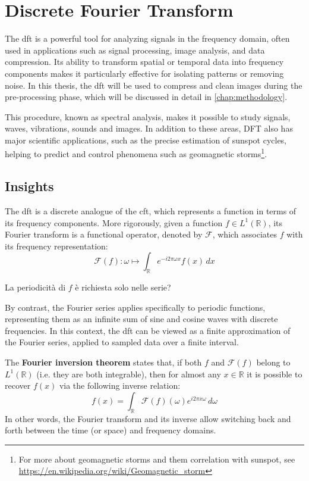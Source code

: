 \section{Discrete Fourier Transform}
\begin{modified}
The \gls{dft} is a powerful tool for analyzing signals in the frequency domain, often used in applications such as signal processing, image analysis, and data compression. Its ability to transform spatial or temporal data into frequency components makes it particularly effective for isolating patterns or removing noise. In this thesis, the \gls{dft} will be used to compress and clean images during the pre-processing phase, which will be discussed in detail in \cref{chap:methodology}.
\end{modified}

\noindent This procedure, known as spectral analysis, makes it possible to study signals, waves, vibrations, sounds and images. In addition to these areas, DFT also has major scientific applications, such as the precise estimation of sunspot cycles, helping to predict and control phenomena such as geomagnetic storms\footnote{For more about geomagnetic storms and them correlation with sunspot, see \url{https://en.wikipedia.org/wiki/Geomagnetic_storm}}.

\subsection{Insights}
\begin{modified}
	The \gls{dft} is a discrete analogue of the \gls{cft}, which represents a function in terms of its frequency components. More rigorously, given a function $f\in L^1(\mathbb{R})$, its Fourier transform is a functional operator, denoted by $\mathcal{F}$, which associates $f$ with its frequency representation:
	\[
		\mathcal{F}(f): \omega \mapsto \int_{\mathbb{R}} e^{-i2\pi \omega x}f(x)\,dx
	\]
	\begin{note}
		La periodicità di $f$ è richiesta solo nelle serie?
	\end{note}

	\noindent By contrast, the Fourier series applies specifically to periodic functions, representing them as an infinite sum of sine and cosine waves with discrete frequencies. In this context, the \gls{dft} can be viewed as a finite approximation of the Fourier series, applied to sampled data over a finite interval.
\end{modified}

\noindent The \textbf{Fourier inversion theorem} states that, if both $f$ and $\mathcal{F}(f)$ belong to $L^1(\mathbb{R})$ (i.e. they are both integrable), then for almost any $x\in\mathbb{R}$ it is possible to recover $f(x)$ via the following inverse relation:
\[
f(x)=\int_{\mathbb{R}}{\mathcal{F}\left(f\right)}(\omega)e^{i2\pi x\omega}\,d\omega
\]
In other words, the Fourier transform and its inverse allow switching back and forth between the time (or space) and frequency domains.

